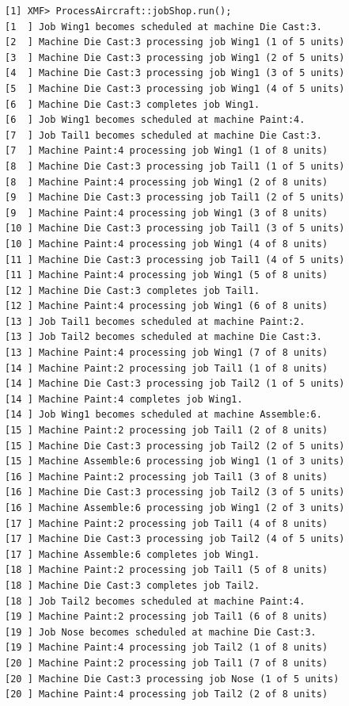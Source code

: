\begin{lstlisting}
[1] XMF> ProcessAircraft::jobShop.run();
[1  ] Job Wing1 becomes scheduled at machine Die Cast:3.
[2  ] Machine Die Cast:3 processing job Wing1 (1 of 5 units)
[3  ] Machine Die Cast:3 processing job Wing1 (2 of 5 units)
[4  ] Machine Die Cast:3 processing job Wing1 (3 of 5 units)
[5  ] Machine Die Cast:3 processing job Wing1 (4 of 5 units)
[6  ] Machine Die Cast:3 completes job Wing1.
[6  ] Job Wing1 becomes scheduled at machine Paint:4.
[7  ] Job Tail1 becomes scheduled at machine Die Cast:3.
[7  ] Machine Paint:4 processing job Wing1 (1 of 8 units)
[8  ] Machine Die Cast:3 processing job Tail1 (1 of 5 units)
[8  ] Machine Paint:4 processing job Wing1 (2 of 8 units)
[9  ] Machine Die Cast:3 processing job Tail1 (2 of 5 units)
[9  ] Machine Paint:4 processing job Wing1 (3 of 8 units)
[10 ] Machine Die Cast:3 processing job Tail1 (3 of 5 units)
[10 ] Machine Paint:4 processing job Wing1 (4 of 8 units)
[11 ] Machine Die Cast:3 processing job Tail1 (4 of 5 units)
[11 ] Machine Paint:4 processing job Wing1 (5 of 8 units)
[12 ] Machine Die Cast:3 completes job Tail1.
[12 ] Machine Paint:4 processing job Wing1 (6 of 8 units)
[13 ] Job Tail1 becomes scheduled at machine Paint:2.
[13 ] Job Tail2 becomes scheduled at machine Die Cast:3.
[13 ] Machine Paint:4 processing job Wing1 (7 of 8 units)
[14 ] Machine Paint:2 processing job Tail1 (1 of 8 units)
[14 ] Machine Die Cast:3 processing job Tail2 (1 of 5 units)
[14 ] Machine Paint:4 completes job Wing1.
[14 ] Job Wing1 becomes scheduled at machine Assemble:6.
[15 ] Machine Paint:2 processing job Tail1 (2 of 8 units)
[15 ] Machine Die Cast:3 processing job Tail2 (2 of 5 units)
[15 ] Machine Assemble:6 processing job Wing1 (1 of 3 units)
[16 ] Machine Paint:2 processing job Tail1 (3 of 8 units)
[16 ] Machine Die Cast:3 processing job Tail2 (3 of 5 units)
[16 ] Machine Assemble:6 processing job Wing1 (2 of 3 units)
[17 ] Machine Paint:2 processing job Tail1 (4 of 8 units)
[17 ] Machine Die Cast:3 processing job Tail2 (4 of 5 units)
[17 ] Machine Assemble:6 completes job Wing1.
[18 ] Machine Paint:2 processing job Tail1 (5 of 8 units)
[18 ] Machine Die Cast:3 completes job Tail2.
[18 ] Job Tail2 becomes scheduled at machine Paint:4.
[19 ] Machine Paint:2 processing job Tail1 (6 of 8 units)
[19 ] Job Nose becomes scheduled at machine Die Cast:3.
[19 ] Machine Paint:4 processing job Tail2 (1 of 8 units)
[20 ] Machine Paint:2 processing job Tail1 (7 of 8 units)
[20 ] Machine Die Cast:3 processing job Nose (1 of 5 units)
[20 ] Machine Paint:4 processing job Tail2 (2 of 8 units)

\end{lstlisting}
